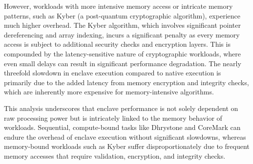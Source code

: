 However, workloads with more intensive memory access or intricate memory patterns, such as Kyber (a post-quantum cryptographic algorithm), experience much higher overhead. The Kyber algorithm, which involves significant pointer dereferencing and array indexing, incurs a significant penalty as every memory access is subject to additional security checks and encryption layers. This is compounded by the latency-sensitive nature of cryptographic workloads, where even small delays can result in significant performance degradation. The nearly threefold slowdown in enclave execution compared to native execution is primarily due to the added latency from memory encryption and integrity checks, which are inherently more expensive for memory-intensive algorithms.

This analysis underscores that enclave performance is not solely dependent on raw processing power but is intricately linked to the memory behavior of workloads. Sequential, compute-bound tasks like Dhrystone and CoreMark can endure the overhead of enclave execution without significant slowdowns, whereas memory-bound workloads such as Kyber suffer disproportionately due to frequent memory accesses that require validation, encryption, and integrity checks.

